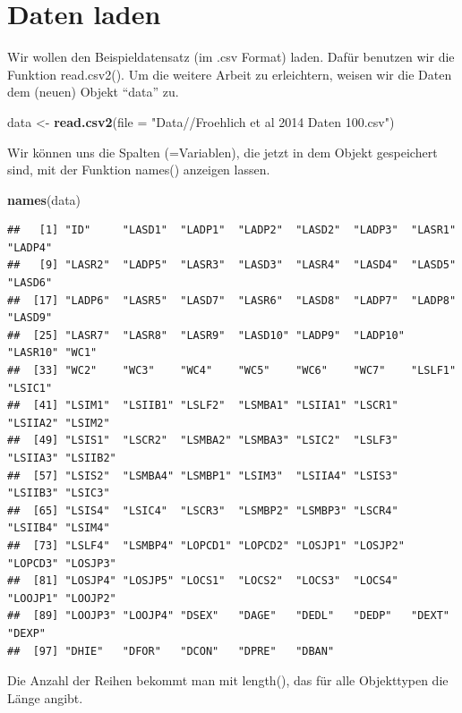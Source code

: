 \documentclass[
]{book}
\newenvironment{Shaded}{\begin{snugshade}}{\end{snugshade}}
\newcommand{\DataTypeTok}[1]{\textcolor[rgb]{0.13,0.29,0.53}{#1}}
\newcommand{\KeywordTok}[1]{\textcolor[rgb]{0.13,0.29,0.53}{\textbf{#1}}}
\newcommand{\NormalTok}[1]{#1}
\newcommand{\StringTok}[1]{\textcolor[rgb]{0.31,0.60,0.02}{#1}}
\begin{document}
\hypertarget{daten-laden}{%
\section{Daten laden}\label{daten-laden}}

Wir wollen den Beispieldatensatz (im .csv Format) laden. Dafür benutzen wir die Funktion read.csv2(). Um die weitere Arbeit zu erleichtern, weisen wir die Daten dem (neuen) Objekt ``data'' zu.

\begin{Shaded}
\begin{Highlighting}[]
\NormalTok{data <-}\StringTok{ }\KeywordTok{read.csv2}\NormalTok{(}\DataTypeTok{file =} \StringTok{"Data//Froehlich et al 2014 Daten 100.csv"}\NormalTok{)}
\end{Highlighting}
\end{Shaded}

Wir können uns die Spalten (=Variablen), die jetzt in dem Objekt gespeichert sind, mit der Funktion names() anzeigen lassen.

\begin{Shaded}
\begin{Highlighting}[]
\KeywordTok{names}\NormalTok{(data)}
\end{Highlighting}
\end{Shaded}

\begin{verbatim}
##   [1] "ID"     "LASD1"  "LADP1"  "LADP2"  "LASD2"  "LADP3"  "LASR1"  "LADP4" 
##   [9] "LASR2"  "LADP5"  "LASR3"  "LASD3"  "LASR4"  "LASD4"  "LASD5"  "LASD6" 
##  [17] "LADP6"  "LASR5"  "LASD7"  "LASR6"  "LASD8"  "LADP7"  "LADP8"  "LASD9" 
##  [25] "LASR7"  "LASR8"  "LASR9"  "LASD10" "LADP9"  "LADP10" "LASR10" "WC1"   
##  [33] "WC2"    "WC3"    "WC4"    "WC5"    "WC6"    "WC7"    "LSLF1"  "LSIC1" 
##  [41] "LSIM1"  "LSIIB1" "LSLF2"  "LSMBA1" "LSIIA1" "LSCR1"  "LSIIA2" "LSIM2" 
##  [49] "LSIS1"  "LSCR2"  "LSMBA2" "LSMBA3" "LSIC2"  "LSLF3"  "LSIIA3" "LSIIB2"
##  [57] "LSIS2"  "LSMBA4" "LSMBP1" "LSIM3"  "LSIIA4" "LSIS3"  "LSIIB3" "LSIC3" 
##  [65] "LSIS4"  "LSIC4"  "LSCR3"  "LSMBP2" "LSMBP3" "LSCR4"  "LSIIB4" "LSIM4" 
##  [73] "LSLF4"  "LSMBP4" "LOPCD1" "LOPCD2" "LOSJP1" "LOSJP2" "LOPCD3" "LOSJP3"
##  [81] "LOSJP4" "LOSJP5" "LOCS1"  "LOCS2"  "LOCS3"  "LOCS4"  "LOOJP1" "LOOJP2"
##  [89] "LOOJP3" "LOOJP4" "DSEX"   "DAGE"   "DEDL"   "DEDP"   "DEXT"   "DEXP"  
##  [97] "DHIE"   "DFOR"   "DCON"   "DPRE"   "DBAN"
\end{verbatim}

Die Anzahl der Reihen bekommt man mit length(), das für alle Objekttypen die Länge angibt.
\end{document}
